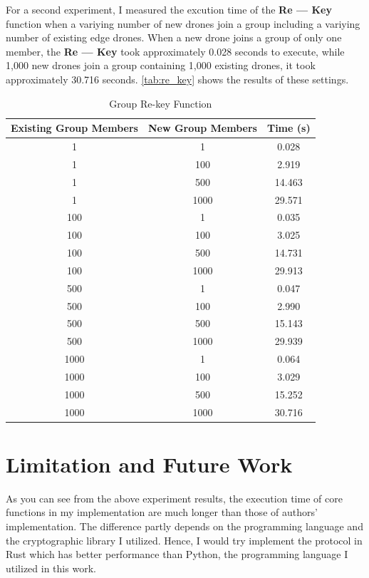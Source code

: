 \documentclass{article}
\begin{document}
For a second experiment, I measured the excution time of the \textbf{Re --- Key}
function when a variying number of new drones join a group including a variying
number of existing edge drones. When a new drone joins a group of only one member,
the \textbf{Re --- Key} took approximately 0.028 seconds to execute, while 1,000 new
drones join a group containing 1,000 existing drones, it took approximately 30.716
seconds. \autoref{tab:re_key} shows the results of these settings.

\begin{table}[!ht]
    \centering
    \begin{tabular}{|c|c|c|}
    \hline
        \textbf{Existing Group Members} & \textbf{New Group Members} & \textbf{Time (s)} \\ \hline
        1 & 1 & 0.028 \\
        1 & 100 & 2.919 \\
        1 & 500 & 14.463 \\
        1 & 1000 & 29.571 \\ \hline
        100 & 1 & 0.035 \\
        100 & 100 & 3.025 \\
        100 & 500 & 14.731 \\
        100 & 1000 & 29.913 \\ \hline
        500 & 1 & 0.047 \\ 
        500 & 100 & 2.990 \\
        500 & 500 & 15.143 \\
        500 & 1000 & 29.939 \\ \hline
        1000 & 1 & 0.064 \\
        1000 & 100 & 3.029 \\
        1000 & 500 & 15.252 \\
        1000 & 1000 & 30.716 \\ \hline
    \end{tabular}
    \caption{Group Re-key Function}\label{tab:re_key}
\end{table}

\section{Limitation and Future Work}
%
As you can see from the above experiment results, the execution time of core
functions in my implementation are much longer than those of authors' implementation.
The difference partly depends on the programming language and the cryptographic
library I utilized. Hence, I would try implement the protocol in Rust which has
better performance than Python, the programming language I utilized in this work.

\printbibliography{}
\end{document}
